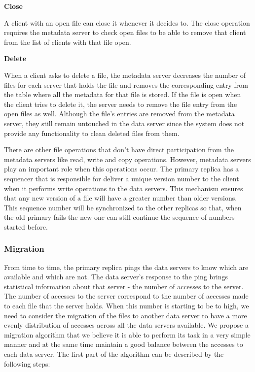 
\bigskip
\textbf{Close}
\smallskip

A client with an open file can close it whenever it decides to. The close
operation requires the metadata server to check open files to be able to
remove that client from the list of clients with that file open.

\bigskip
\textbf{Delete}
\smallskip

When a client asks to delete a file, the metadata server decreases the
number of files for each server that holds the file and removes the 
corresponding entry from the table where all the metadata for that file is stored.
If the file is open when the client tries to delete it, the server needs
to remove the file entry from the open files as well.
Although the file's entries are removed from the metadata server, they
still remain untouched in the data server since the system does not provide
any functionality to clean deleted files from them.

\bigskip

There are other file operations that don't have direct participation from the
metadata servers like read, write and copy operations. However, metadata servers
play an important role when this operations occur. The primary replica has a sequencer
that is responsible for deliver a unique version number to the client when it performs
write operations to the data servers. This mechanism ensures that any new version of a
file will have a greater number than older versions. This sequence number will be
synchronized to the other replicas so that, when the old primary fails the new one can
still continue the sequence of numbers started before.

\subsubsection{Migration}

From time to time, the primary replica pings the data servers to know
which are available and which are not. The data server's response to the ping
brings statistical information about that server - the number of accesses to
the server. The number of accesses to the server correspond to the number
of accesses made to each file that the server holds. When this number is
starting to be to high, we need to consider the migration of the files to another
data server to have a more evenly distribution of accesses across all the data
servers available. We propose a migration algorithm that we believe it is able
to perform its task in a very simple manner and at the same time maintain
a good balance between the accesses to each data server. The first part of the
algorithm can be described by the following steps:

